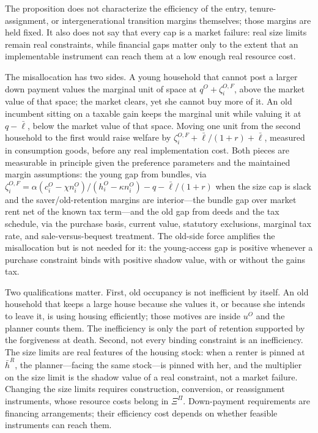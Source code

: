 \documentclass[11pt]{article}
\newcommand{\1}{\mathbf 1}
\begin{document}
The proposition does not characterize the efficiency of the entry, tenure-assignment, or intergenerational transition margins themselves; those margins are held fixed. It also does not say that every cap is a market failure: real size limits remain real constraints, while financial gaps matter only to the extent that an implementable instrument can reach them at a low enough real resource cost.

The misallocation has two sides. A young household that cannot post a larger down payment values the marginal unit of space at $q^O+\zeta_i^{O,F}$, above the market value of that space; the market clears, yet she cannot buy more of it. An old incumbent sitting on a taxable gain keeps the marginal unit while valuing it at $q-\bar\ell$, below the market value of that space. Moving one unit from the second household to the first would raise welfare by $\zeta_i^{O,F}+\bar\ell/(1+r)+\bar\ell$, measured in consumption goods, before any real implementation cost. Both pieces are measurable in principle given the preference parameters and the maintained margin assumptions: the young gap from bundles, via $\zeta_i^{O,F}=\alpha(c_i^O-\chi n_i^O)/(h_i^O-\kappa n_i^O)-q-\bar\ell/(1+r)$ when the size cap is slack and the saver/old-retention margins are interior---the bundle gap over market rent net of the known tax term---and the old gap from deeds and the tax schedule, via the purchase basis, current value, statutory exclusions, marginal tax rate, and sale-versus-bequest treatment. The old-side force amplifies the misallocation but is not needed for it: the young-access gap is positive whenever a purchase constraint binds with positive shadow value, with or without the gains tax.

Two qualifications matter. First, old occupancy is not inefficient by itself. An old household that keeps a large house because she values it, or because she intends to leave it, is using housing efficiently; those motives are inside $u^O$ and the planner counts them. The inefficiency is only the part of retention supported by the forgiveness at death. Second, not every binding constraint is an inefficiency. The size limits are real features of the housing stock: when a renter is pinned at $\bar h^R$, the planner---facing the same stock---is pinned with her, and the multiplier on the size limit is the shadow value of a real constraint, not a market failure. Changing the size limits requires construction, conversion, or reassignment instruments, whose resource costs belong in $\Xi^\Pi$. Down-payment requirements are financing arrangements; their efficiency cost depends on whether feasible instruments can reach them.
\end{document}
